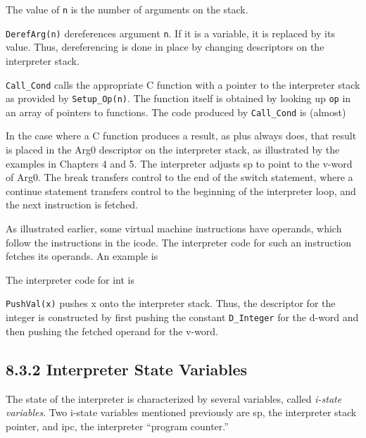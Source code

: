 The value of \texttt{n} is the number of arguments on the stack.

\texttt{DerefArg(n)} dereferences argument \texttt{n}. If it is a
variable, it is replaced by its value. Thus, dereferencing is done in
place by changing descriptors on the interpreter stack.

\texttt{Call\_Cond} calls the appropriate C function with a pointer to
the interpreter stack as provided by \texttt{Setup\_Op(n)}. The
function itself is obtained by looking up \texttt{op} in an array of
pointers to functions.  The code produced by \texttt{Call\_Cond} is
(almost)

\goodbreak
\iconcode{
\>(*(optab(op]) )(rargp);\\
\>sp = (word * )rargp + 1:
}

In the case where a C function produces a result, as plus always does,
that result is placed in the Arg0 descriptor on the interpreter stack,
as illustrated by the examples in Chapters 4 and 5. The interpreter
adjusts sp to point to the v-word of Arg0. The break transfers control
to the end of the switch statement, where a continue statement
transfers control to the beginning of the interpreter loop, and the
next instruction is fetched.

As illustrated earlier, some virtual machine instructions have
operands, which follow the instructions in the icode. The interpreter
code for such an instruction fetches its operands. An example is


The interpreter code for int is

\goodbreak
{}

\texttt{PushVal(x)} pushes x onto the interpreter stack. Thus, the descriptor
for the integer is constructed by first pushing the constant \texttt{D\_Integer}
for the d-word and then pushing the fetched operand for the v-word.

\subsection[8.3.2 Interpreter State Variables]{8.3.2 Interpreter State Variables}

The state of the interpreter is characterized by several variables,
called \textit{i-state variables}. Two i-state variables mentioned
previously are sp, the interpreter stack pointer, and ipc, the
interpreter ``program counter.''

